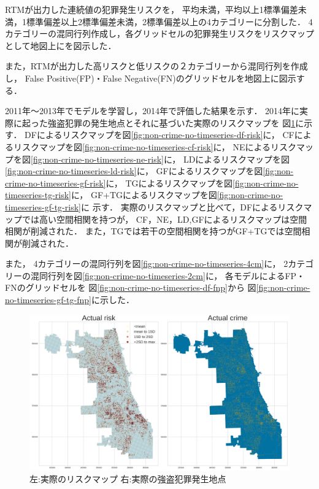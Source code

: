 RTMが出力した連続値の犯罪発生リスクを，
平均未満，平均以上1標準偏差未満，1標準偏差以上2標準偏差未満，2標準偏差以上の4カテゴリーに分割した．
4カテゴリーの混同行列作成し，各グリッドセルの犯罪発生リスクをリスクマップとして地図上にを図示した．

また，RTMが出力した高リスクと低リスクの２カテゴリーから混同行列を作成し，
False Positive(FP)・False Negative(FN)のグリッドセルを地図上に図示する．

2011年〜2013年でモデルを学習し，2014年で評価した結果を示す．
2014年に実際に起った強盗犯罪の発生地点とそれに基づいた実際のリスクマップを
図\ref{fig:non-crime-no-timeseries-actual-risk}に示す．
DFによるリスクマップを図\ref{fig:non-crime-no-timeseries-df-risk}に，
CFによるリスクマップを図\ref{fig:non-crime-no-timeseries-cf-risk}に，
NEによるリスクマップを図\ref{fig:non-crime-no-timeseries-ne-risk}に，
LDによるリスクマップを図\ref{fig:non-crime-no-timeseries-ld-risk}に，
GFによるリスクマップを図\ref{fig:non-crime-no-timeseries-gf-risk}に，
TGによるリスクマップを図\ref{fig:non-crime-no-timeseries-tg-risk}に，
GF+TGによるリスクマップを図\ref{fig:non-crime-no-timeseries-gf-tg-risk}に
示す．
実際のリスクマップと比べて，DFによるリスクマップでは高い空間相関を持つが，
CF，NE，LD,GFによるリスクマップは空間相関が削減された．
また，TGでは若干の空間相関を持つがGF+TGでは空間相関が削減された．


また，
4カテゴリーの混同行列を図\ref{fig:non-crime-no-timeseries-4cm}に，
2カテゴリーの混同行列を図\ref{fig:non-crime-no-timeseries-2cm}に，
各モデルによるFP・FNのグリッドセルを
図\ref{fig:non-crime-no-timeseries-df-fnp}から
図\ref{fig:non-crime-no-timeseries-gf-tg-fnp}に示した．

\begin{figure}
  \centering %
  \includegraphics[scale=0.25]{./non-crime-no-timeseries-fig/actual_risk_point_map.png}
  \caption{左:実際のリスクマップ 右:実際の強盗犯罪発生地点}
  \label{fig:non-crime-no-timeseries-actual-risk}
\end{figure}

